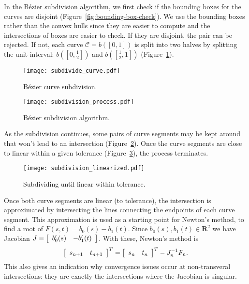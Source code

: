 \documentclass[letterpaper,10pt]{article}
\theoremstyle{definition}
\newcommand{\reals}{\mathbf{R}}
\begin{document}
In the B\'{e}zier subdivision algorithm, we first check if the
bounding boxes for the curves are disjoint
(Figure~\ref{fig:bounding-box-check}).
We use the bounding boxes
rather than the convex hulls since they are easier to compute and
the intersections of boxes are easier to check.
If they are disjoint, the pair can be rejected. If not, each curve
\(\mathcal{C} = b\left(\left[0, 1\right]\right)\) is split into two halves
by splitting the unit interval: \(b\left(\left[0, \frac{1}{2}\right]\right)\)
and \(b\left(\left[\frac{1}{2}, 1\right]\right)\)
(Figure~\ref{fig:bezier-curve-subdivision}).

\begin{figure}
  \texttt{[image: subdivide\_curve.pdf]}
  \centering
  \captionsetup{width=.75\linewidth}
  \caption{B\'{e}zier curve subdivision.}
  \label{fig:bezier-curve-subdivision}
\end{figure}

\begin{figure}
  \texttt{[image: subdivision\_process.pdf]}
  \centering
  \captionsetup{width=.75\linewidth}
  \caption{B\'{e}zier subdivision algorithm.}
  \label{fig:bezier-subdivision-process}
\end{figure}

As the subdivision continues,
some pairs of curve segments may be kept around that won't lead to an
intersection (Figure~\ref{fig:bezier-subdivision-process}).
Once the curve segments are close to linear within a given tolerance
(Figure~\ref{fig:bezier-subdivision-linearized}), the process
terminates.

\begin{figure}
  \texttt{[image: subdivision\_linearized.pdf]}
  \centering
  \captionsetup{width=.75\linewidth}
  \caption{Subdividing until linear within tolerance.}
  \label{fig:bezier-subdivision-linearized}
\end{figure}

Once both curve segments are linear (to tolerance), the intersection is
approximated by intersecting the lines connecting the endpoints of each
curve segment. This approximation is used as a starting point for Newton's
method, to find a root of \(F(s, t) = b_0(s) - b_1(t)\). Since
\(b_0(s), b_1(t) \in \reals^2\) we have Jacobian \(J =
\left[ \begin{array}{c c} b_0'(s) & -b_1'(t) \end{array}\right]\).
With these, Newton's method is
\begin{equation}
\left[ \begin{array}{c c} s_{n + 1} & t_{n + 1} \end{array}\right]^T =
\left[ \begin{array}{c c} s_n & t_n \end{array}\right]^T -
J_n^{-1} F_n.
\end{equation}
This also gives an indication why convergence issues occur at non-transveral
intersections: they are exactly the intersections where the Jacobian is
singular.
\end{document}
